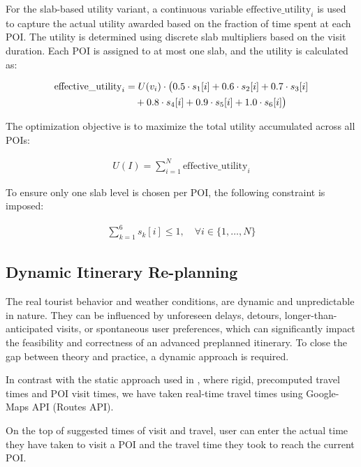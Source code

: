 For the slab-based utility variant, a continuous variable \( \text{effective\_utility}_i \) is used to capture the actual utility awarded based on the fraction of time spent at each POI. The utility is determined using discrete slab multipliers based on the visit duration. Each POI is assigned to at most one slab, and the utility is calculated as:

\begin{align}
\label{effective_utility}
\text{effective\_utility}_i &= U(v_i) \cdot \big(0.5 \cdot s_1[i] + 0.6 \cdot s_2[i] + 0.7 \cdot s_3[i] \notag \\
&\quad + 0.8 \cdot s_4[i] + 0.9 \cdot s_5[i] + 1.0 \cdot s_6[i] \big)
\end{align}

The optimization objective is to maximize the total utility accumulated across all POIs:

\begin{align}
\label{objective_fun_slabs}
U(I) = \sum_{i=1}^N \text{effective\_utility}_i
\end{align}

To ensure only one slab level is chosen per POI, the following constraint is imposed:

\begin{align}
\sum_{k=1}^{6} s_k[i] \leq 1, \quad \forall i \in \{1, \dots, N\}
\end{align}




\subsection{Dynamic Itinerary Re-planning}
The real tourist behavior and weather conditions, are dynamic and unpredictable in nature. They can be influenced by unforeseen delays, detours, longer-than-anticipated visits, or spontaneous user preferences, which can significantly impact the feasibility and correctness of an advanced preplanned itinerary. To close the gap between theory and practice, a dynamic approach is required.

In contrast with the static approach used in \cite{taylor2018tour}, where rigid, precomputed travel times and POI visit times, we have taken real-time travel times using Google-Maps API (Routes API). 

On the top of suggested times of visit and travel, user can enter the actual time they have taken to visit a POI and the travel time they took to reach the current POI.

